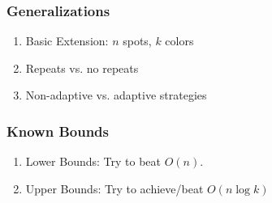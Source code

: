 \documentclass{beamer}
\begin{document}
    \begin{frame}
    	\frametitle{Generalizations}
		\begin{enumerate}[label=\roman*.]
		\item Basic Extension: $n$ spots, $k$ colors
		\item Repeats vs. no repeats
		\item Non-adaptive vs. adaptive strategies
		\end{enumerate}
    \end{frame}


    \begin{frame}
    	\frametitle{Known Bounds}
	\begin{enumerate}[label=\arabic*.]
	\item Lower Bounds: Try to beat $O(n)$.
	\item Upper Bounds: Try to achieve/beat $O(n \log k)$
	\end{enumerate}
    \end{frame}
	
    
\end{document}
